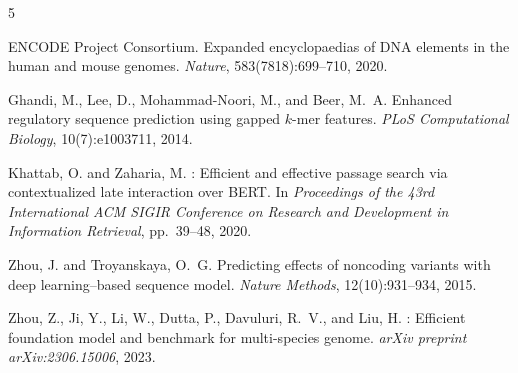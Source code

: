 \documentclass[10pt,twocolumn]{article}
\begin{document}
\small
\begin{thebibliography}{5}
\setlength{\itemsep}{2pt}
\setlength{\parsep}{0pt}

ENCODE Project Consortium.
\newblock Expanded encyclopaedias of {DNA} elements in the human and mouse genomes.
\newblock \emph{Nature}, 583(7818):699--710, 2020.

Ghandi, M., Lee, D., Mohammad-Noori, M., and Beer, M.~A.
\newblock Enhanced regulatory sequence prediction using gapped $k$-mer features.
\newblock \emph{PLoS Computational Biology}, 10(7):e1003711, 2014.

Khattab, O. and Zaharia, M.
: Efficient and effective passage search via contextualized late interaction over {BERT}.
\newblock In \emph{Proceedings of the 43rd International ACM SIGIR Conference on Research and Development in Information Retrieval}, pp.\ 39--48, 2020.

Zhou, J. and Troyanskaya, O.~G.
\newblock Predicting effects of noncoding variants with deep learning--based sequence model.
\newblock \emph{Nature Methods}, 12(10):931--934, 2015.

Zhou, Z., Ji, Y., Li, W., Dutta, P., Davuluri, R.~V., and Liu, H.
: Efficient foundation model and benchmark for multi-species genome.
\newblock \emph{arXiv preprint arXiv:2306.15006}, 2023.

\end{thebibliography}
\end{document}
